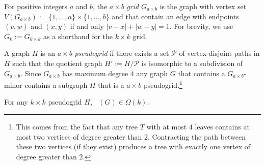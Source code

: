 \documentclass{patmorin}
\DeclareMathOperator{\chilin}{\chi_{\mathrm{lin}}}
\begin{document}
For positive integers $a$ and $b$, the $a\times b$ \emph{grid} $G_{a\times b}$ is the graph with vertex set $V(G_{a\times b}):=\{1,\ldots,a\}\times\{1,\ldots,b\}$ and that contain an edge with endpoints $(v,w)$ and $(x,y)$ if and only $|v-x|+|w-y|=1$. For brevity, we use $G_{k}:=G_{k\times k}$ as a shorthand for the $k\times k$ grid.

A graph $H$ is an $a\times b$ \emph{pseudogrid} if there exists a set $\mathcal{P}$ of vertex-disjoint paths in $H$ such that the quotient graph $H':=H/\mathcal{P}$ is isomorphic to a subdivision of $G_{a\times b}$.  Since $G_{a\times b}$ has maximum degree $4$ any graph $G$ that contains a $G_{a\times b}$-minor contains a subgraph $H$ that is a $a\times b$ pseudogrid.\footnote{This comes from the fact that any tree $T$ with at most $4$ leaves contains at most two vertices of degree greater than $2$.  Contracting the path between these two vertices (if they exist) produces a tree with exactly one vertex of degree greater than $2$.}

\begin{lem}
  For any $k\times k$ pseudogrid $H$, $\chilin(G)\in\Omega(k)$.
\end{lem}
\end{document}
